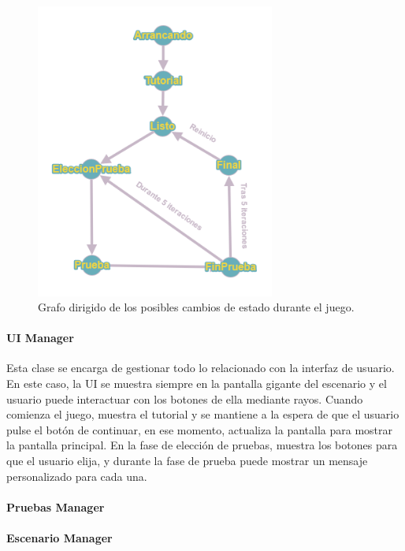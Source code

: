\begin{figure}
	\centering
	\includegraphics[width=0.7\textwidth]{04.Desarrollo/05.Entrega5/01.Iteracion5_1/00.Figuras/10.grafo_estados.png}
	\caption{Grafo dirigido de los posibles cambios de estado durante el juego.}
	\label{fig:grafoEstados}
\end{figure}




\paragraph{UI Manager}
Esta clase se encarga de gestionar todo lo relacionado con la interfaz de usuario. En este caso, la UI se muestra siempre en la pantalla gigante del escenario y el usuario puede interactuar con los botones de ella mediante rayos. Cuando comienza el juego, muestra el tutorial y se mantiene a la espera de que el usuario pulse el botón de continuar, en ese momento, actualiza la pantalla para mostrar la pantalla principal. En la fase de elección de pruebas, muestra los botones para que el usuario elija, y durante la fase de prueba puede mostrar un mensaje personalizado para cada una.

\paragraph{Pruebas Manager}

\paragraph{Escenario Manager}

